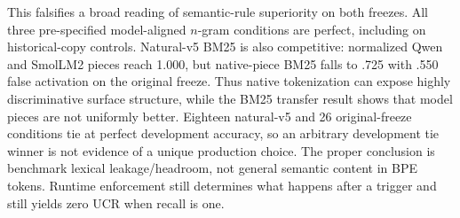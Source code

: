 \documentclass[11pt]{article}
\begin{document}
\begin{table}[t]
\centering\scriptsize
\caption{Matched trigger classification. Acc.=binary accuracy, Rec.=retrieval
recall, FA=false activation. Native rows use raw model pieces and token
unigrams+bigrams. The 80-example freeze uses its disjoint 160/40 policy
train/development sets; natural-v5 uses its own 96/32 split.}
\label{tab:tokenizer-trigger}
\end{table}

This falsifies a broad reading of semantic-rule superiority on both freezes.
All three pre-specified model-aligned $n$-gram conditions are perfect, including
on historical-copy controls. Natural-v5 BM25 is also competitive: normalized
Qwen and SmolLM2 pieces reach 1.000, but native-piece BM25 falls to .725 with
.550 false activation on the original freeze. Thus native tokenization can
expose highly discriminative surface structure, while the BM25 transfer result
shows that model pieces are not uniformly better. Eighteen natural-v5 and 26
original-freeze conditions tie at perfect development accuracy, so an arbitrary
development tie winner is not evidence of a unique production choice. The
proper conclusion is benchmark lexical leakage/headroom, not general semantic
content in BPE tokens. Runtime enforcement still determines what happens after
a trigger and still yields zero UCR when recall is one.
\end{document}
